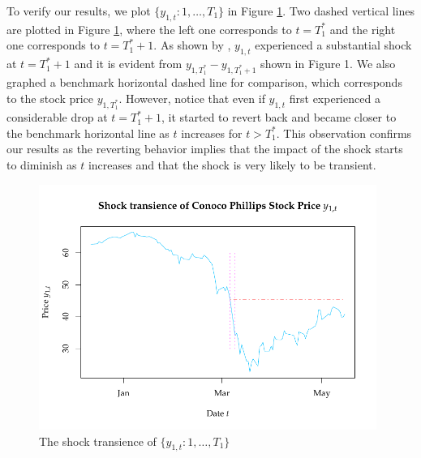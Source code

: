 \documentclass[11pt]{article}
\theoremstyle{definition}
\begin{document}
To verify our results, we plot $\{y_{1,t} \colon 1, \ldots, T_1\}$ in Figure \ref{copshocktransience}. Two dashed vertical lines are plotted in Figure \ref{copshocktransience}, where the left one corresponds to $t = T_1^*$ and the right one  corresponds to $t = T_1^*+1$. As shown by \cite{lin2021minimizing}, $y_{1,t}$ experienced a substantial shock at  $t = T_1^*+1$ and it is evident from $y_{1, T_1^*}-y_{1, T_1^*+1}$ shown in Figure 1. We also graphed a benchmark horizontal dashed line for comparison, which corresponds to the stock price $y_{1, T_1^*}$. However, notice that even if $y_{1,t}$ first experienced a considerable drop at $t = T_1^*+1$,   it started to revert back and became closer to the benchmark horizontal line as $t$ increases for $t > T_1^*$. This observation confirms our results as the reverting behavior implies that the impact of the shock starts to diminish as $t$ increases and that the shock is very likely to be transient.


\begin{figure}[H]
	\begin{center}
		\includegraphics[height = 8cm]{COPtransience.pdf}
		\caption{The shock transience of $\{y_{1,t} \colon 1, \ldots, T_1\}$} \label{copshocktransience}
	\end{center}	
\end{figure}
\end{document}
